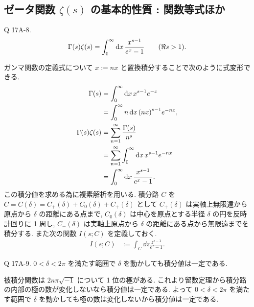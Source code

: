 \documentclass[uplatex,dvipdfmx,a4paper,11pt]{jlreq}
\theoremstyle{definition}
\begin{document}
\subsection{ゼータ関数 $\zeta(s)$ の基本的性質 : 関数等式ほか}
\begin{itembox}[l]{Q 17A-8.}
  \begin{align}
    \Gamma(s)\zeta(s) = \int_0^\infty\dd{x}\frac{x^{s-1}}{e^x - 1} \qquad (\real s > 1).
  \end{align}
\end{itembox}

ガンマ関数の定義式について $x := nx$ と置換積分することで次のように式変形できる.
\begin{align}
  \Gamma(s)         & = \int_0^\infty \dd{x}x^{s-1}e^{-x}                     \\
                    & = \int_0^\infty n\dd{x}\qty(nx)^{s-1}e^{-nx},           \\
  \Gamma(s)\zeta(s) & = \sum_{n=1}^{\infty}\frac{\Gamma(s)}{n^s}              \\
                    & = \sum_{n=1}^{\infty}\int_0^\infty \dd{x}x^{s-1}e^{-nx} \\
                    & = \int_0^\infty\dd{x}\frac{x^{s-1}}{e^x - 1}.
\end{align}
この積分値を求める為に複素解析を用いる. 積分路 $C$ を $C = C(\delta) = C_+(\delta) + C_0(\delta) + C_+(\delta)$ として $C_+(\delta)$ は実軸上無限遠から原点から $\delta$ の距離にある点まで, $C_0(\delta)$ は中心を原点とする半径 $\delta$ の円を反時計回りに 1 周し, $C_-(\delta)$ は実軸上原点から $\delta$ の距離にある点から無限遠までを積分する. また次の関数 $I(s; C)$ を定義しておく.
\begin{align}
  I(s; C) & := \int_C\dd{z}\frac{z^{s-1}}{e^z - 1}.
\end{align}

\begin{itembox}[l]{Q 17A-9.}
  $0 <\delta < 2\pi$ を満たす範囲で $\delta$ を動かしても積分値は一定である.
\end{itembox}
被積分関数は $2n\pi\sqrt{-1}$ について 1 位の極がある. これより留数定理から積分路の内部の極の数が変化しないなら積分値は一定である. よって $0 <\delta < 2\pi$ を満たす範囲で $\delta$ を動かしても極の数は変化しないから積分値は一定である.
\end{document}
